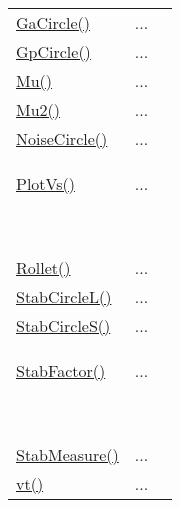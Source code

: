 \textcolor{blue}{}\begin{tabular}{>{\raggedleft}b{3cm}>{\centering}b{0.5cm}>{\raggedright}b{12cm}}
\textcolor{blue}{\hyperlink{GaCircle}{GaCircle()}}&
...&
 \begin{NoHyper} \nameref{par:GaCircle} \end{NoHyper}\tabularnewline
\textcolor{blue}{\hyperlink{GpCircle}{GpCircle()}}&
...&
 \begin{NoHyper} \nameref{par:GpCircle} \end{NoHyper}\tabularnewline
\textcolor{blue}{\hyperlink{Mu}{Mu()}}&
...&
 \begin{NoHyper} \nameref{par:Mu-stability-factor} \end{NoHyper}\tabularnewline
\textcolor{blue}{\hyperlink{Mu2}{Mu2()}}&
...&
 \begin{NoHyper} \nameref{par:Mu2-stability-factor} \end{NoHyper}\tabularnewline
\textcolor{blue}{\hyperlink{NoiseCircle}{NoiseCircle()}}&
...&
 \begin{NoHyper} \nameref{par:NoiseCircle} \end{NoHyper}\tabularnewline
\textcolor{blue}{\hyperlink{PlotVs}{PlotVs()}}

\textcolor{blue}{~}&
...

\textcolor{blue}{~}&
 \begin{NoHyper} \nameref{par:PlotVs} \end{NoHyper}\tabularnewline
\textcolor{blue}{\hyperlink{Rollet}{Rollet()}}&
...&
 \begin{NoHyper} \nameref{par:Rollet-stability-factor} \end{NoHyper}\tabularnewline
\textcolor{blue}{\hyperlink{StabCircleL}{StabCircleL()}}&
...&
 \begin{NoHyper} \nameref{par:StabCircleL} \end{NoHyper}\tabularnewline
\textcolor{blue}{\hyperlink{StabCircleS}{StabCircleS()}}&
...&
 \begin{NoHyper} \nameref{par:StabCircleS} \end{NoHyper}\tabularnewline
\textcolor{blue}{\hyperlink{StabFactor}{StabFactor()}}

\textcolor{blue}{~}&
...

\textcolor{blue}{~}&
 \begin{NoHyper} \nameref{par:StabFactor} \end{NoHyper}\tabularnewline
\textcolor{blue}{\hyperlink{StabMeasure}{StabMeasure()}}&
...&
 \begin{NoHyper} \nameref{par:StabMeasure} \end{NoHyper}\tabularnewline
\textcolor{blue}{\hyperlink{vt}{vt()}}&
...&
 \begin{NoHyper} \nameref{par:vt} \end{NoHyper}\tabularnewline
\end{tabular}
% 
